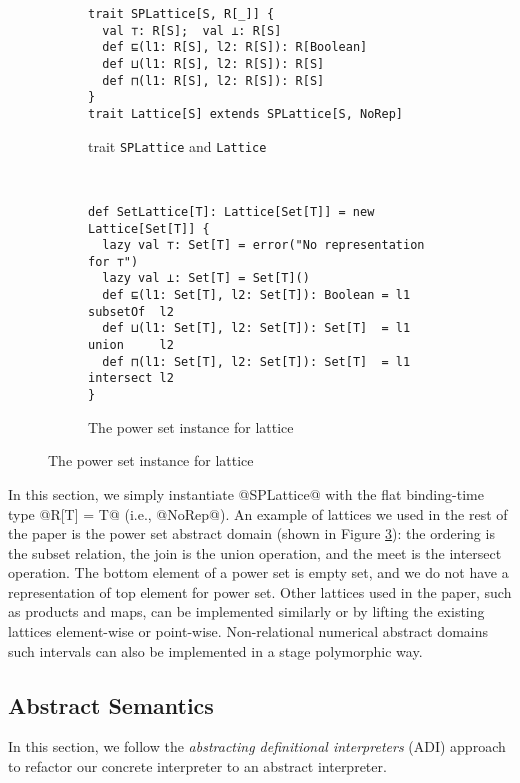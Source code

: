 \begin{figure}[h!]
  \centering
  \begin{subfigure}[b]{0.45\textwidth}
  \begin{lstlisting}[style=small]
trait SPLattice[S, R[_]] {
  val ⊤: R[S];  val ⊥: R[S]
  def ⊑(l1: R[S], l2: R[S]): R[Boolean]
  def ⊔(l1: R[S], l2: R[S]): R[S]
  def ⊓(l1: R[S], l2: R[S]): R[S]
}
trait Lattice[S] extends SPLattice[S, NoRep]
  \end{lstlisting}
  \caption{trait \texttt{SPLattice} and \texttt{Lattice}} \label{fig:splattice}
  \end{subfigure}
  ~
  \begin{subfigure}[b]{0.6\textwidth}
\begin{lstlisting}[style=small]
def SetLattice[T]: Lattice[Set[T]] = new Lattice[Set[T]] {
  lazy val ⊤: Set[T] = error("No representation for ⊤")
  lazy val ⊥: Set[T] = Set[T]()
  def ⊑(l1: Set[T], l2: Set[T]): Boolean = l1 subsetOf  l2
  def ⊔(l1: Set[T], l2: Set[T]): Set[T]  = l1 union     l2
  def ⊓(l1: Set[T], l2: Set[T]): Set[T]  = l1 intersect l2
}
\end{lstlisting}
  \caption{The power set instance for lattice} \label{fig:powerset}
\end{subfigure}
\end{figure}

In this section, we simply instantiate @SPLattice@ with the flat binding-time type
@R[T] = T@ (i.e., @NoRep@).
An example of lattices we used in the rest of the paper is the power set
abstract domain (shown in Figure \ref{fig:powerset}): the ordering is the subset
relation, the join is the union operation, and the meet is the intersect
operation. The bottom element of a power set is empty set, and we do not have a
representation of top element for power set.  Other lattices used in the paper, such as
products and maps, can be implemented similarly or by lifting the existing
lattices element-wise or point-wise. Non-relational numerical abstract domains
such intervals can also be implemented in a stage polymorphic way.

\subsection{Abstract Semantics}

In this section, we follow the \textit{abstracting definitional interpreters}
(ADI) approach \cite{DBLP:journals/pacmpl/DaraisLNH17} to refactor our concrete
interpreter to an abstract interpreter.

